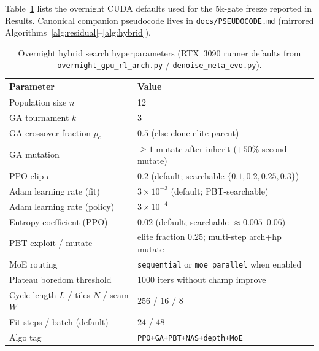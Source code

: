 Table~\ref{tab:hyperparams} lists the overnight CUDA defaults used for the $5$k-gate freeze reported in Results.
Canonical companion pseudocode lives in \texttt{docs/PSEUDOCODE.md} (mirrored Algorithms~\ref{alg:residual}--\ref{alg:hybrid}).

\begin{table}[t]
  \centering
  \small
  \caption{Overnight hybrid search hyperparameters (RTX~3090 runner defaults from \texttt{overnight\_gpu\_rl\_arch.py} / \texttt{denoise\_meta\_evo.py}).}
  \label{tab:hyperparams}
  \setlength{\tabcolsep}{3pt}
  \begin{tabular}{@{}lp{}@{}}
    \toprule
    Parameter & Value \\
    \midrule
    Population size $n$ & 12 \\
    GA tournament $k$ & 3 \\
    GA crossover fraction $p_c$ & $0.5$ (else clone elite parent) \\
    GA mutation & $\ge 1$ mutate after inherit ($+50\%$ second mutate) \\
    PPO clip $\epsilon$ & $0.2$ (default; searchable $\{0.1,0.2,0.25,0.3\}$) \\
    Adam learning rate (fit) & $3{\times}10^{-3}$ (default; PBT-searchable) \\
    Adam learning rate (policy) & $3{\times}10^{-4}$ \\
    Entropy coefficient (PPO) & $0.02$ (default; searchable $\approx 0.005$--$0.06$) \\
    PBT exploit / mutate & elite fraction $0.25$; multi-step arch+hp mutate \\
    MoE routing & \texttt{sequential} or \texttt{moe\_parallel} when enabled \\
    Plateau boredom threshold & $1000$ iters without champ improve \\
    Cycle length $L$ / tiles $N$ / seam $W$ & $256$ / $16$ / $8$ \\
    Fit steps / batch (default) & $24$ / $48$ \\
    Algo tag & \texttt{PPO+GA+PBT+NAS+depth+MoE} \\
    \bottomrule
  \end{tabular}
\end{table}
